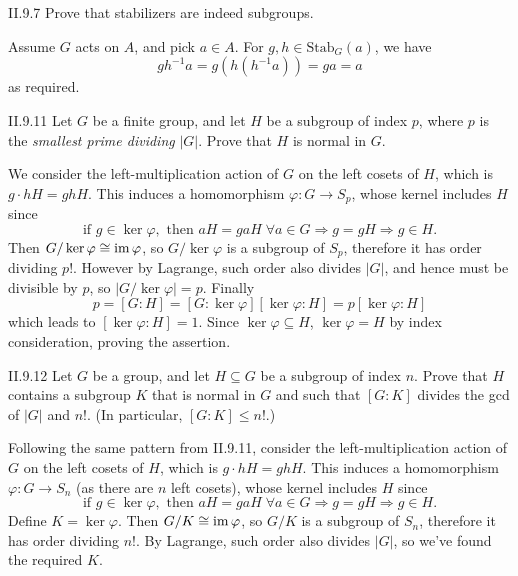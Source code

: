 \section{}

\begin{problem}{II.9.7}
Prove that stabilizers are indeed subgroups.
\end{problem}
\begin{pf}
Assume $G$ acts on $A$, and pick $a \in A$. For $g,h \in \text{Stab}_G(a)$, we have
\[
gh^{-1}a = g(h(h^{-1}a)) = ga = a
\]
as required.
\end{pf}

\begin{problem}{II.9.11}
Let $G$ be a finite group, and let $H$ be a subgroup of index $p$, where $p$ is the \emph{smallest prime dividing} $|G|$. Prove that $H$ is normal in $G$.
\end{problem}
\begin{pf}
We consider the left-multiplication action of $G$ on the left cosets of $H$, which is $g \cdot hH = ghH$. This induces a homomorphism $\varphi : G \to S_p$, whose kernel includes $H$ since
\[
\text{if } g \in \ker \varphi, \text{ then } aH = gaH \; \forall a \in G \Rightarrow g = gH \Rightarrow g \in H.
\]
Then $G/\ker \varphi \cong \operatorname{im} \varphi$, so $G/\ker \varphi$ is a subgroup of $S_p$, therefore it has order dividing $p!$. However by Lagrange, such order also divides $|G|$, and hence must be divisible by $p$, so $|G/\ker \varphi| = p$. Finally
\[
p = [G : H] = [G : \ker \varphi][\ker \varphi : H] = p[\ker \varphi : H]
\]
which leads to $[\ker \varphi : H] = 1$. Since $\ker \varphi \subseteq H$, $\ker \varphi = H$ by index consideration, proving the assertion. 
\end{pf}

\begin{problem}{II.9.12}
Let $G$ be a group, and let $H \subseteq G$ be a subgroup of index $n$. Prove that $H$ contains a subgroup $K$ that is normal in $G$ and such that $[G : K]$ divides the gcd of $|G|$ and $n!$. (In particular, $[G:K] \leq n!$.)
\end{problem}
\begin{pf}
Following the same pattern from II.9.11, consider the left-multiplication action of $G$ on the left cosets of $H$, which is $g \cdot hH = ghH$. This induces a homomorphism $\varphi : G \to S_n$ (as there are $n$ left cosets), whose kernel includes $H$ since
\[
\text{if } g \in \ker \varphi, \text{ then } aH = gaH \; \forall a \in G \Rightarrow g = gH \Rightarrow g \in H.
\]
Define $K = \ker \varphi$. Then $G/K \cong \operatorname{im} \varphi$, so $G/K$ is a subgroup of $S_n$, therefore it has order dividing $n!$. By Lagrange, such order also divides $|G|$, so we've found the required $K$.
\end{pf}

